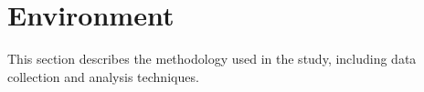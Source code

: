 \section{Environment}
\label{sec:environment}

This section describes the methodology used in the study, including data collection and analysis techniques.
